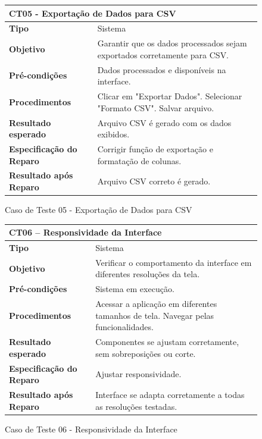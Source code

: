\begin{figure}[H]
    \centering
\begin{longtable}{|p{}|p{}|}
\hline
\multicolumn{2}{|l|}{\textbf{CT05 - Exportação de Dados para CSV}} \\
\hline
\textbf{Tipo} & Sistema \\
\hline
\textbf{Objetivo} & Garantir que os dados processados sejam exportados corretamente para CSV. \\
\hline
\textbf{Pré-condições} & Dados processados e disponíveis na interface. \\
\hline
\textbf{Procedimentos} & Clicar em "Exportar Dados".  Selecionar "Formato CSV".  Salvar arquivo.  \\
\hline
\textbf{Resultado esperado} & Arquivo CSV é gerado com os dados exibidos. \\
\hline
\textbf{Especificação do Reparo} & Corrigir função de exportação e formatação de colunas. \\
\hline
\textbf{Resultado após Reparo} & Arquivo CSV correto é gerado. \\
\hline
\end{longtable}
\caption{Caso de Teste 05 - Exportação de Dados para CSV}
\label{fig_ct05_exportacao_dados_csv}
\end{figure}

\begin{figure}[H]
    \centering
\begin{longtable}{|p{}|p{}|}
\hline
\multicolumn{2}{|l|}{\textbf{CT06 – Responsividade da Interface}} \\
\hline
\textbf{Tipo} & Sistema \\
\hline
\textbf{Objetivo} & Verificar o comportamento da interface em diferentes resoluções da tela. \\
\hline
\textbf{Pré-condições} & Sistema em execução. \\
\hline
\textbf{Procedimentos} & Acessar a aplicação em diferentes tamanhos de tela. Navegar pelas funcionalidades. \\
\hline
\textbf{Resultado esperado} & Componentes se ajustam corretamente, sem sobreposições ou corte. \\
\hline
\textbf{Especificação do Reparo} & Ajustar responsividade. \\
\hline
\textbf{Resultado após Reparo} & Interface se adapta corretamente a todas as resoluções testadas. \\
\hline
\end{longtable}
\caption{Caso de Teste 06 - Responsividade da Interface}
\label{fig_ct06_responsividade_interface}
\end{figure}

